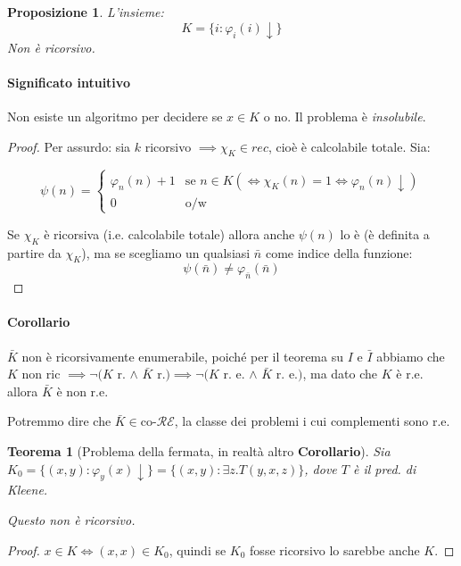 \documentclass[a4paper,10pt,oneside]{article}
\theoremstyle{break}
\newtheorem{prop}{Proposizione}[subsection]
\newtheorem{teo}{Teorema}[subsection]
\begin{document}
\begin{mdframed}

\begin{prop} L'insieme:
\[ K = \{ i : \varphi_i(i) \downarrow\} \]
Non è ricorsivo.
\end{prop}

\dotfill

\paragraph{Significato intuitivo}

Non esiste un algoritmo per decidere se $x \in K$ o no. Il problema è \emph{insolubile}.

\dotfill

\begin{proof}
Per assurdo: sia $k$ ricorsivo $\implies \chi_K \in rec$, cioè è calcolabile totale. Sia:

\[ \psi(n) = \begin{cases}
              \varphi_n(n) + 1 & \text{se } n \in K (\iff \chi_K(n) = 1 \iff \varphi_n(n) \downarrow)\\
              0 & \text{o/w}
             \end{cases}
 \]

 Se $\chi_K$ è ricorsiva (i.e. calcolabile totale) allora anche $\psi(n)$ lo è (è definita a partire da $\chi_K$), ma se scegliamo un qualsiasi $\bar n$ come indice della funzione:
\[\psi(\bar n) \neq \varphi_{\bar n} (\bar n)\]

\end{proof}

\dotfill

\paragraph{Corollario} $\bar K$ non è ricorsivamente enumerabile, poiché per il teorema su $I$ e $\bar I$ abbiamo che $K$ non ric $\implies \lnot(K$ r. $\wedge\,\, \bar K$ r.$) \implies \lnot(K$ r. e. $\wedge\,\, \bar K$ r. e.$)$, ma dato che $K$ è r.e. allora $\bar K$ è non r.e.

Potremmo dire che $\bar K \in \text{co-}\mathcal{RE}$, la classe dei problemi i cui complementi sono r.e.
\end{mdframed}
\newpage

\begin{mdframed}
 \begin{teo}[Problema della fermata, in realtà altro \textbf{Corollario}]
  Sia $K_0 = \{(x, y) : \varphi_y(x) \downarrow\} = \{ (x, y) : \exists z . T(y, x, z) \}$, dove $T$ è il pred. di Kleene.\smallskip

  Questo non è ricorsivo.

  \dotfill

 \end{teo}
 \begin{proof}
  $x \in K \iff (x, x) \in K_0$, quindi se $K_0$ fosse ricorsivo lo sarebbe anche $K$.
 \end{proof}

\end{mdframed}
\end{document}
